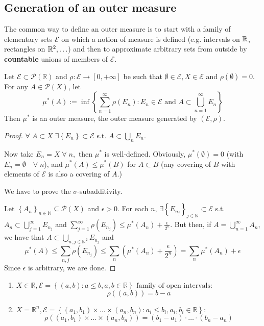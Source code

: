 \subsection{Generation of an outer measure}
The common way to define an outer measure is to start with a family of elementary sets \(\mathcal{E}\) on which a notion of measure is defined (e.g. intervals on \(\mathbb{R}\), rectangles on \(\mathbb{R}^2, \ldots\)) and then to approximate arbitrary sets from outside by \textbf{countable} unions of members of \(\mathcal{E}\).
\begin{proposition}
    Let \(\mathcal{E} \subset \mathcal{P}(\mathbb{R})\) and \(\rho : \mathcal{E} \to [0, +\infty]\) be such that \(\emptyset \in \mathcal{E}, X \in \mathcal{E}\) and \(\rho(\emptyset) = 0\). For any \(A \in \mathcal{P}(X)\), let 
    \[\mu^*(A) := \inf \left\lbrace \sum_{n=1}^{\infty} \rho (E_n) : E_n \in \mathcal{E} \mbox{ and } A \subset \bigcup_{n=1}^{\infty} E_n \right\rbrace\]
    Then \(\mu^*\) is an outer measure, the outer measure generated by \((\mathcal{E}, \rho)\).
\end{proposition}
\begin{proof}
    \(\forall \; A \subset X \; \exists \left\lbrace E_n \right\rbrace \subset \mathcal{E}\) s.t. \(A \subset \bigcup_n E_n\). 
    
    Now take  \(E_n = X \; \forall \; n,\)
    then \(\mu^*\) is well-defined. Obviously, \(\mu^*(\emptyset) = 0\) (with \(E_n = \emptyset \quad \forall\; n\)), and \(\mu^*(A) \leq \mu^*(B)\) for \(A \subset B\) (any covering of \(B\) with elements of \(\mathcal{E}\) is also a covering of \(A\).)

    We have to prove the \(\sigma\)-subadditivity. 
    
    \noindent Let \(\left\lbrace A_n \right\rbrace_{n \in \mathbb{N}} \subseteq \mathcal{P}(X)\) and \(\epsilon > 0\). For each \(n, \, \exists \left\lbrace E_{n_j} \right\rbrace_{j \in \mathbb{N}} \subset \mathcal{E}\) s.t. \(A_n \subset \bigcup_{j = 1}^{\infty} E_{n_j}\) and \(\sum_{j=1}^{\infty} \rho(E_{n_j}) \leq \mu^*(A_n) + \frac{\epsilon}{2^n}\).  
    But then, if \(A = \bigcup_{n=1}^{\infty} A_n\), we have that \(A \subset \bigcup_{n,j \in \mathbb{N}^2} E_{n_j}\) and
    \[
        \mu^*(A) \leq \sum_{n,j} \rho(E_{n_j}) \leq \sum_{n} \left(\mu^*(A_n) + \frac{\epsilon}{2^n}\right) = \sum_{n} \mu^*(A_n) + \epsilon
    \]
    Since \(\epsilon\) is arbitrary, we are done.
\end{proof}
\begin{example}
    \begin{enumerate}
        \item \(X \in \mathbb{R}, \mathcal{E} = \left\lbrace (a,b) : a \leq b, a,b \in \mathbb{R} \right\rbrace \mbox{ family of open intervals:} \)
        \[
            \rho((a,b)) = b-a
        \]
        
        \item \(X = \mathbb{R}^n, \mathcal{E} = \left\lbrace (a_1, b_1) \times \ldots \times (a_n, b_n) : a_i \leq b_i, a_i, b_i \in \mathbb{R} \right\rbrace\): 
        \[
            \rho((a_1, b_1)\times \ldots \times (a_n, b_n)) = (b_1 -a_1) \cdot \ldots \cdot (b_n - a_n)
        \]
    \end{enumerate}
\end{example}
